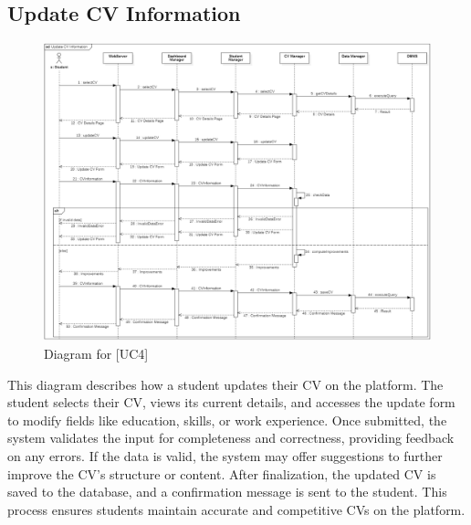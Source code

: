 \subsection{Update CV Information}
\begin{figure} [H]
    \centering
    \includegraphics[width=1\linewidth]{DD/Images/Runtime Sequence Diagram Images/update_cv_information.png}
    \caption{Diagram for [UC4]}
    \label{fig: Update CV Information Diagram}
\end{figure}
This diagram describes how a student updates their CV on the platform. The student selects their CV, views its current details, and accesses the update form to modify fields like education, skills, or work experience. Once submitted, the system validates the input for completeness and correctness, providing feedback on any errors. If the data is valid, the system may offer suggestions to further improve the CV’s structure or content. After finalization, the updated CV is saved to the database, and a confirmation message is sent to the student. This process ensures students maintain accurate and competitive CVs on the platform.

